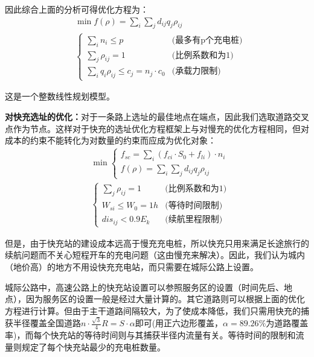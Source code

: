 \documentclass[12pt, a4paper, oneside]{ctexart}
\begin{document}
因此综合上面的分析可得优化方程为：
\begin{equation}
    \begin{aligned}
         & \min  f(\rho)=\sum_i \sum_jd_{ij} q_j \rho_{ij} \\
         & \begin{cases}
            \sum\limits_i n_i\leqslant p                                     & \text{(最多有p个充电桩)} \\
            \sum\limits_j \rho_{ij}=1                               & \text{(比例系数和为1)} \\
            \sum\limits_i q_{i}\rho_{ij}\leqslant c_j=n_j \cdot c_0 & \text{(承载力限制)}
        \end{cases}
    \end{aligned}
    \label{fun:优化lc}
\end{equation}

这是一个整数线性规划模型。

\textbf{对快充选址的优化：}对于一条路上选址的最佳地点在端点\cite[]{cite:端点}，因此我们选取道路交叉点作为节点。这样对于快充的选址优化方程框架上与对慢充的优化方程相同，但对成本的约束不能转化为对数量的约束而应成为优化对象：
\begin{equation}
    \begin{aligned}
        & \min  \begin{cases}
            f_{sc}=\sum\limits_{i}(f_{ci}\cdot S_0+f_{li})\cdot n_i\\
            f(\rho)=\sum_i \sum_jd_{ij} q_j \rho_{ij}
        \end{cases} \\
        & \begin{cases}
           \sum\limits_j \rho_{ij}=1    & \text{(比例系数和为1)} \\
           W_{si}\leqslant W_0=1h & \text{(等待时间限制)}\\
           dis_{ij}<0.9E_k&\text{(续航里程限制)}
       \end{cases}
    \end{aligned}
\end{equation}

但是，由于快充站的建设成本远高于慢充充电桩，所以快充只用来满足长途旅行的续航问题而不关心短程开车的充电问题（这由慢充来解决）。因此，我们认为城内（地价高）的地方不用设快充充电站，而只需要在城际公路上设置。

城际公路中，高速公路上的快充站设置可以参照服务区的设置（时间先后、地点），因为服务区的设置一般是经过大量计算的。其它道路则可以根据上面的优化方程进行计算。但由于主干道路间隔较大，为了使成本降低，我们只需用快充的捕获半径覆盖全国道路\(n\cdot \frac{\sqrt3}{4}R = S\cdot \alpha\)即可(用正六边形覆盖，\(\alpha=89.26\%\)为道路覆盖率)，而每个快充站的等待时间则与其捕获半径内流量有关。等待时间的限制和流量则规定了每个快充站最少的充电桩数量。
\end{document}
